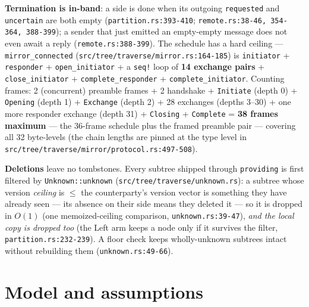 \documentclass[11pt]{article}
\newcommand{\code}[1]{\texttt{#1}}
\theoremstyle{plain}
\begin{document}
\textbf{Termination is in-band}: a side is done when its outgoing
\code{requested} and \code{uncertain} are both empty
(\code{partition.rs:393-410}; \code{remote.rs:38-46, 354-364, 388-399}); a
sender that just emitted an empty-empty message does not even await a reply
(\code{remote.rs:388-399}). The schedule has a hard ceiling ---
\code{mirror\_connected} (\code{src/tree/traverse/mirror.rs:164-185}) is
\code{initiator} + \code{responder} + \code{open\_initiator} + a \code{seq!}
loop of \textbf{14 exchange pairs} + \code{close\_initiator} +
\code{complete\_responder} + \code{complete\_initiator}. Counting frames:
2 (concurrent) preamble frames + 2 handshake + \code{Initiate} (depth 0) +
\code{Opening} (depth 1) +
\code{Exchange} (depth 2) + 28 exchanges (depths 3--30) + one more responder
exchange (depth 31) + \code{Closing} + \code{Complete} = \textbf{38 frames
maximum} --- the 36-frame schedule plus the framed preamble pair ---
covering all 32 byte-levels (the chain lengths are pinned at the
type level in \code{src/tree/traverse/mirror/protocol.rs:497-508}).

\textbf{Deletions} leave no tombstones. Every subtree shipped through
\code{providing} is first filtered by \code{Unknown::unknown}
(\code{src/tree/traverse/unknown.rs}): a subtree whose version
\emph{ceiling} is $\le$ the counterparty's version vector is something they
have already seen --- its absence on their side means they deleted it --- so
it is dropped in $O(1)$ (one memoized-ceiling comparison,
\code{unknown.rs:39-47}), \emph{and the local copy is dropped too} (the
Left arm keeps a node only if it survives the filter,
\code{partition.rs:232-239}). A floor check keeps wholly-unknown subtrees
intact without rebuilding them (\code{unknown.rs:49-66}).

\section{Model and assumptions}
\end{document}
